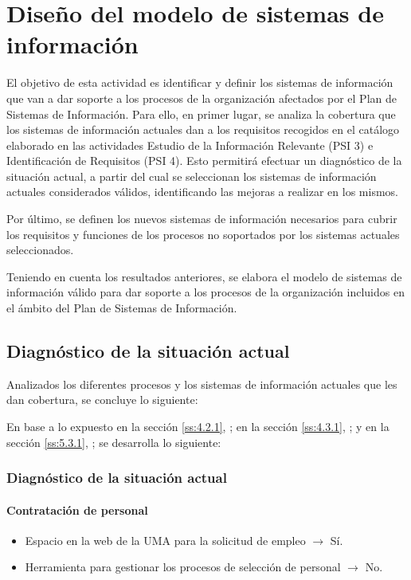 \documentclass[11pt,a4paper,spanish,twoside]{book}
\begin{document}
\chapter{Diseño del modelo de sistemas de información}
El objetivo de esta actividad es identificar y definir los sistemas de
información que van a dar soporte a los procesos de la organización afectados
por el Plan de Sistemas de Información. Para ello, en primer lugar, se
analiza la cobertura que los sistemas de información actuales dan a los
requisitos recogidos en el catálogo elaborado en las actividades Estudio de
la Información Relevante (PSI 3) e Identificación de Requisitos (PSI 4). Esto
permitirá efectuar un diagnóstico de la situación actual, a partir del cual
se seleccionan los sistemas de información actuales considerados válidos,
identificando las mejoras a realizar en los mismos. 

Por último, se definen los nuevos sistemas de información necesarios para
cubrir los requisitos y funciones de los procesos no soportados por los
sistemas actuales seleccionados. 

Teniendo en cuenta los resultados anteriores, se elabora el modelo de
sistemas de información válido para dar soporte a los procesos de la
organización incluidos en el ámbito del Plan de Sistemas de Información. 

\section{Diagnóstico de la situación actual}
Analizados los diferentes procesos y los sistemas de información actuales que
les dan cobertura, se concluye lo siguiente:

En base a lo expuesto 
en la sección \vref{ss:4.2.1}, \emph{}; 
en la sección \vref{ss:4.3.1}, \emph{}; y 
en la sección \vref{ss:5.3.1}, \emph{};
se desarrolla lo siguiente:

\subsection{Diagnóstico de la situación actual} \label{ss:6.1.1}
\subsubsection{Contratación de personal}
\begin{itemize}
\item Espacio en la web de la UMA para la solicitud de empleo $\to$ Sí.
\item Herramienta para gestionar los procesos de selección de personal $\to$ No.
\end{itemize}
\end{document}
